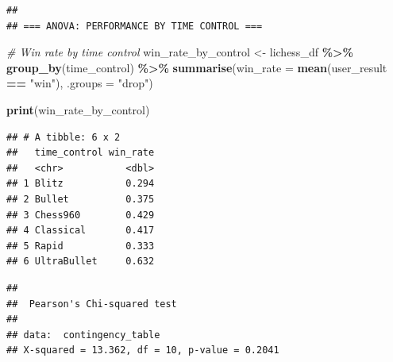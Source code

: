 \documentclass[
]{article}
\newenvironment{Shaded}{\begin{snugshade}}{\end{snugshade}}
\newcommand{\AttributeTok}[1]{\textcolor[rgb]{0.13,0.29,0.53}{#1}}
\newcommand{\CommentTok}[1]{\textcolor[rgb]{0.56,0.35,0.01}{\textit{#1}}}
\newcommand{\ControlFlowTok}[1]{\textcolor[rgb]{0.13,0.29,0.53}{\textbf{#1}}}
\newcommand{\DecValTok}[1]{\textcolor[rgb]{0.00,0.00,0.81}{#1}}
\newcommand{\FunctionTok}[1]{\textcolor[rgb]{0.13,0.29,0.53}{\textbf{#1}}}
\newcommand{\NormalTok}[1]{#1}
\newcommand{\OtherTok}[1]{\textcolor[rgb]{0.56,0.35,0.01}{#1}}
\newcommand{\SpecialCharTok}[1]{\textcolor[rgb]{0.81,0.36,0.00}{\textbf{#1}}}
\newcommand{\StringTok}[1]{\textcolor[rgb]{0.31,0.60,0.02}{#1}}
\begin{document}
\begin{verbatim}
## 
## === ANOVA: PERFORMANCE BY TIME CONTROL ===
\end{verbatim}

\begin{Shaded}
\begin{Highlighting}[]
\CommentTok{\# Win rate by time control}
\NormalTok{win\_rate\_by\_control }\OtherTok{\textless{}{-}}\NormalTok{ lichess\_df }\SpecialCharTok{\%\textgreater{}\%}
  \FunctionTok{group\_by}\NormalTok{(time\_control) }\SpecialCharTok{\%\textgreater{}\%}
  \FunctionTok{summarise}\NormalTok{(}\AttributeTok{win\_rate =} \FunctionTok{mean}\NormalTok{(user\_result }\SpecialCharTok{==} \StringTok{"win"}\NormalTok{), }\AttributeTok{.groups =} \StringTok{"drop"}\NormalTok{)}

\FunctionTok{print}\NormalTok{(win\_rate\_by\_control)}
\end{Highlighting}
\end{Shaded}

\begin{verbatim}
## # A tibble: 6 x 2
##   time_control win_rate
##   <chr>           <dbl>
## 1 Blitz           0.294
## 2 Bullet          0.375
## 3 Chess960        0.429
## 4 Classical       0.417
## 5 Rapid           0.333
## 6 UltraBullet     0.632
\end{verbatim}

\begin{Shaded}
\end{Shaded}

\begin{verbatim}
## 
##  Pearson's Chi-squared test
## 
## data:  contingency_table
## X-squared = 13.362, df = 10, p-value = 0.2041
\end{verbatim}
\end{document}
